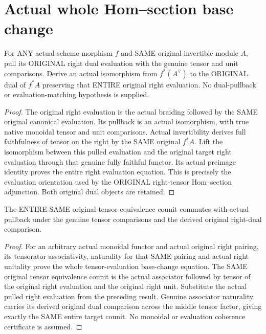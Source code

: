 \section{Actual whole Hom--section base change}

\begin{theorem}\label{sc0-hom-section-base-change:right-evaluation}
\leanok
For ANY actual scheme morphism $f$ and SAME original invertible module $A$, pull its ORIGINAL right dual evaluation with the genuine tensor and unit comparisons. Derive an actual isomorphism from $f^*(A^\vee)$ to the ORIGINAL dual of $f^*A$ preserving that ENTIRE original right evaluation. No dual-pullback or evaluation-matching hypothesis is supplied.
\end{theorem}
\begin{proof}
The original right evaluation is the actual braiding followed by the SAME original canonical evaluation. Its pullback is an actual isomorphism, with true native monoidal tensor and unit comparisons. Actual invertibility derives full faithfulness of tensor on the right by the SAME original $f^*A$. Lift the isomorphism between this pulled evaluation and the original target right evaluation through that genuine fully faithful functor. Its actual preimage identity proves the entire right evaluation equation. This is precisely the evaluation orientation used by the ORIGINAL right-tensor Hom--section adjunction. Both original dual objects are retained.
\end{proof}

\begin{lemma}\label{sc0-hom-section-base-change:counit}
\leanok
{}
The ENTIRE SAME original tensor equivalence counit commutes with actual pullback under the genuine tensor comparisons and the derived original right-dual comparison.
\end{lemma}
\begin{proof}
For an arbitrary actual monoidal functor and actual original right pairing, its tensorator associativity, naturality for that SAME pairing and actual right unitality prove the whole tensor-evaluation base-change equation. The SAME original tensor equivalence counit is the actual associator followed by tensor of the original right evaluation and the original right unit. Substitute the actual pulled right evaluation from the preceding result. Genuine associator naturality carries its derived original dual comparison across the middle tensor factor, giving exactly the SAME entire target counit. No monoidal or evaluation coherence certificate is assumed.
\end{proof}

